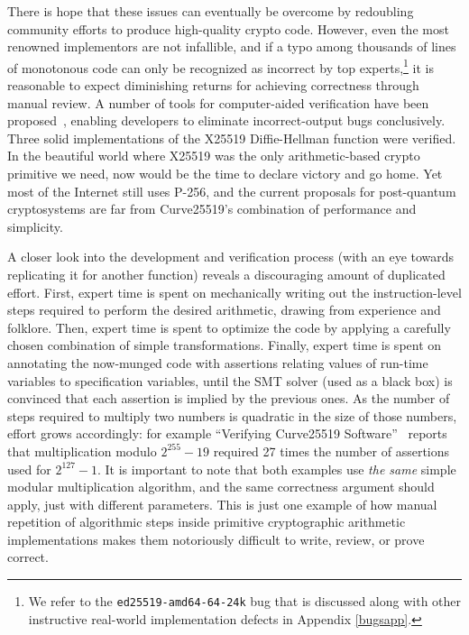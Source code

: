 \documentclass[conference,letterpaper]{IEEEtran}
\begin{document}
There is hope that these issues can eventually be overcome by redoubling community efforts to produce high-quality crypto code.
However, even the most renowned implementors are not infallible, and if a typo among thousands of lines of monotonous code can only be recognized as incorrect by top experts,\footnote{We refer to the \texttt{ed25519-amd64-64-24k} bug that is discussed along with other instructive real-world implementation defects in Appendix \ref{bugsapp}.} it is reasonable to expect diminishing returns for achieving correctness through manual review.
A number of tools for computer-aided verification have been proposed~\cite{verif25519,gfverif,ECCstar,hacl,vale,jasmin}, enabling developers to eliminate incorrect-output bugs conclusively.
Three solid implementations of the X25519 Diffie-Hellman function were verified.
In the beautiful world where X25519 was the only arithmetic-based crypto primitive we need, now would be the time to declare victory and go home.
Yet most of the Internet still uses P-256, and the current proposals for post-quantum cryptosystems are far from Curve25519's combination of performance and simplicity.

A closer look into the development and verification process (with an eye towards replicating it for another function) reveals a discouraging amount of duplicated effort.
First, expert time is spent on mechanically writing out the instruction-level steps required to perform the desired arithmetic, drawing from experience and folklore.
Then, expert time is spent to optimize the code by applying a carefully chosen combination of simple transformations.
Finally, expert time is spent on annotating the now-munged code with assertions relating values of run-time variables to specification variables, until the SMT solver (used as a black box) is convinced that each assertion is implied by the previous ones.
As the number of steps required to multiply two numbers is quadratic in the size of those numbers, effort grows accordingly: for example ``Verifying Curve25519 Software''~\cite{verif25519} reports that multiplication modulo $2^{255}-19$ required 27 times the number of assertions used for $2^{127}-1$.
It is important to note that both examples use \emph{the same} simple modular multiplication algorithm, and the same correctness argument should apply, just with different parameters.
This is just one example of how manual repetition of algorithmic steps inside primitive cryptographic arithmetic implementations makes them notoriously difficult to write, review, or prove correct.
\end{document}
